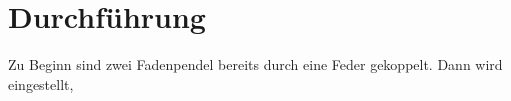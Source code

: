 \section{Durchführung}
\label{sec:Durchführung}
Zu Beginn sind zwei Fadenpendel bereits durch eine Feder gekoppelt. Dann wird eingestellt, 